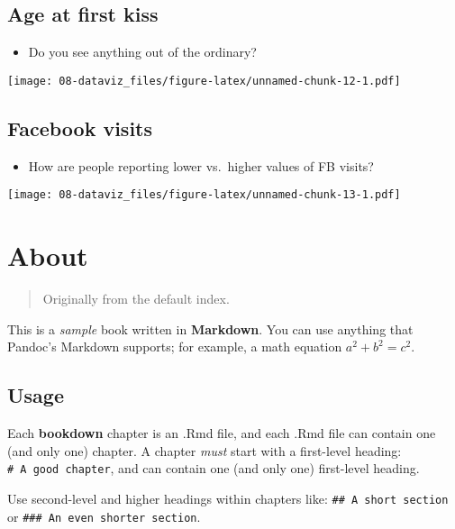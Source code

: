 \documentclass[
]{book}
\providecommand{\tightlist}{%
  \setlength{\itemsep}{0pt}\setlength{\parskip}{0pt}}
\theoremstyle{definition}
\theoremstyle{definition}
\theoremstyle{definition}
\theoremstyle{definition}
\theoremstyle{remark}
\begin{document}
\hypertarget{age-at-first-kiss}{%
\section{Age at first kiss}\label{age-at-first-kiss}}

\begin{itemize}
\tightlist
\item
  Do you see anything out of the ordinary?
\end{itemize}

\texttt{[image: 08-dataviz\_files/figure-latex/unnamed-chunk-12-1.pdf]}

\hypertarget{facebook-visits}{%
\section{Facebook visits}\label{facebook-visits}}

\begin{itemize}
\tightlist
\item
  How are people reporting lower vs.~higher values of FB visits?
\end{itemize}

\texttt{[image: 08-dataviz\_files/figure-latex/unnamed-chunk-13-1.pdf]}

\hypertarget{about}{%
\chapter{About}\label{about}}

\begin{quote}
Originally from the default index.
\end{quote}

This is a \emph{sample} book written in \textbf{Markdown}. You can use anything that Pandoc's Markdown supports; for example, a math equation \(a^2 + b^2 = c^2\).

\hypertarget{usage}{%
\section{Usage}\label{usage}}

Each \textbf{bookdown} chapter is an .Rmd file, and each .Rmd file can contain one (and only one) chapter. A chapter \emph{must} start with a first-level heading: \texttt{\#\ A\ good\ chapter}, and can contain one (and only one) first-level heading.

Use second-level and higher headings within chapters like: \texttt{\#\#\ A\ short\ section} or \texttt{\#\#\#\ An\ even\ shorter\ section}.
\end{document}
